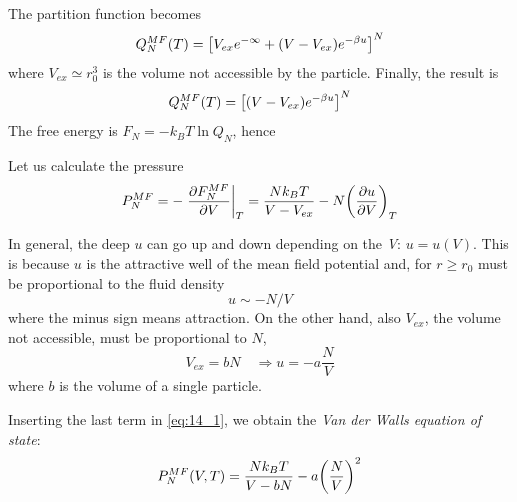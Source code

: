 \documentclass[../main/main.tex]{subfiles}
\begin{document}
\noindent The partition function becomes
\begin{equation*}
  Q_N^{MF} (T) = \qty[ V_{ex}e^{- \infty } + (V-V_{ex})e^{-\beta u} ]^N
\end{equation*}
where \( V_{ex} \simeq r_0^3 \) is the volume not accessible by the particle. Finally, the result is 
\begin{equation}
  Q_N^{MF} (T) = \qty[ (V-V_{ex})e^{-\beta u} ]^N
\end{equation}
The free energy is \( F_N = -k_B T \ln Q_N \), hence 
Let us calculate the pressure 
\begin{equation}
  P_N^{MF} = - \eval{\pdv{F_N^{MF}}{V} }_T = \frac{N k_B T}{V-V_{ex}} - N \qty(\pdv{u}{V} )_T
  \label{eq:14_1}
\end{equation}
\begin{remark}
In general, the deep \( u \)  can go up and down depending on the \emph{V}: \( u = u (V) \). This is because \( u \) is the attractive well of the mean field potential and, for \( r \ge r_0 \) must be proportional to the fluid density
\begin{equation*}
  u \sim -N/V
\end{equation*}
where the minus sign means attraction. On the other hand, also \( V_{ex} \), the volume not accessible, must be proportional to \( N \),
\begin{equation*}
  V_{ex} = b N  \quad  \Rightarrow u = - a \frac{N}{V}
\end{equation*}
where \( b \) is the volume of a single particle.
\end{remark}
Inserting the last term in \eqref{eq:14_1}, we obtain the \emph{Van der Walls equation of state}:
\begin{equation}
  P_N^{MF} (V,T) = \frac{N k_B T}{V-bN} - a \qty(\frac{N}{V})^2
  \label{eq:14_2}
\end{equation}
\end{document}
